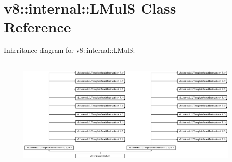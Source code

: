 \hypertarget{classv8_1_1internal_1_1_l_mul_s}{}\section{v8\+:\+:internal\+:\+:L\+MulS Class Reference}
\label{classv8_1_1internal_1_1_l_mul_s}
Inheritance diagram for v8\+:\+:internal\+:\+:L\+MulS\+:\begin{figure}[H]
\begin{center}
\leavevmode
\includegraphics[height=5.724907cm]{classv8_1_1internal_1_1_l_mul_s}
\end{center}
\end{figure}
